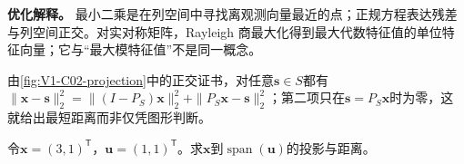 \documentclass[UTF8,a4paper,11pt,openany]{ctexbook}
\begin{document}
\setcounter{page}{18}
\setcounter{chapter}{2}
\setcounter{figure}{0}
\pagestyle{headings}
\begin{optimizationbox}
\textbf{优化解释。} 最小二乘是在列空间中寻找离观测向量最近的点；正规方程表达残差与列空间正交。对实对称矩阵，Rayleigh 商最大化得到最大代数特征值的单位特征向量；它与“最大模特征值”不是同一概念。
\end{optimizationbox}

由\cref{fig:V1-C02-projection}中的正交证书，对任意$\boldsymbol s\in S$都有
$\|\boldsymbol x-\boldsymbol s\|_2^2=\|(I-P_S)\boldsymbol x\|_2^2+\|P_S\boldsymbol x-\boldsymbol s\|_2^2$；第二项只在$\boldsymbol s=P_S\boldsymbol x$时为零，这就给出最短距离而非仅凭图形判断。
\begin{example}[二维投影与残差]
令$\boldsymbol{x}=(3,1)^{\mathsf T}$，$\boldsymbol{u}=(1,1)^{\mathsf T}$。求$\boldsymbol{x}$到$\operatorname{span}(\boldsymbol{u})$的投影与距离。
\end{example}
\end{document}
